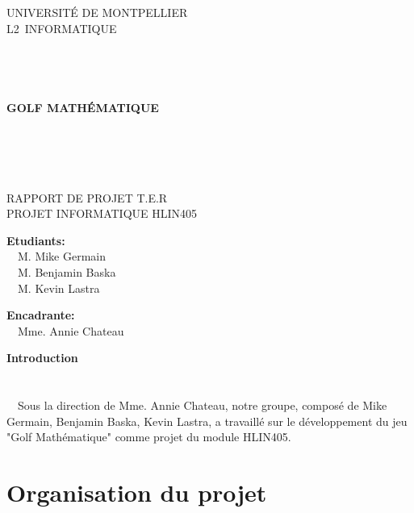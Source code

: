 \documentclass{article}
\begin{document}
\begin{center}
\linespread{2.0}\selectfont

{\Huge U}{\huge NIVERSITÉ DE }{\Huge M}{\huge ONTPELLIER}\\
{\huge L2}{\LARGE ~INFORMATIQUE }
\\~\\~\\~\\~\\
{\Large\textbf{GOLF MATHÉMATIQUE}}
\\~\\~\\~\\~\\

\linespread{1}\selectfont

RAPPORT DE PROJET T.E.R\\
PROJET INFORMATIQUE HLIN405\\
\vfill
\end{center}
\begin{multicols}{2}
\begin{flushleft}
\textbf{Etudiants:}\\
~~M. Mike Germain\\
~~M. Benjamin Baska\\
~~M. Kevin Lastra
\end{flushleft}
\columnbreak
\begin{flushright}
\textbf{Encadrante:}\\
~~Mme. Annie Chateau
\end{flushright}
\end{multicols}
\newpage
\setcounter{page}{1}
\tableofcontents
\newpage
{\textbf{\Huge Introduction}}\\~\\~\\
~~Sous la direction de Mme. Annie Chateau, notre groupe, composé de Mike Germain, Benjamin Baska, Kevin Lastra, a travaillé sur le développement du jeu "Golf Mathématique" comme projet du module HLIN405.

\newpage
\section{Organisation du projet}
\end{document}
